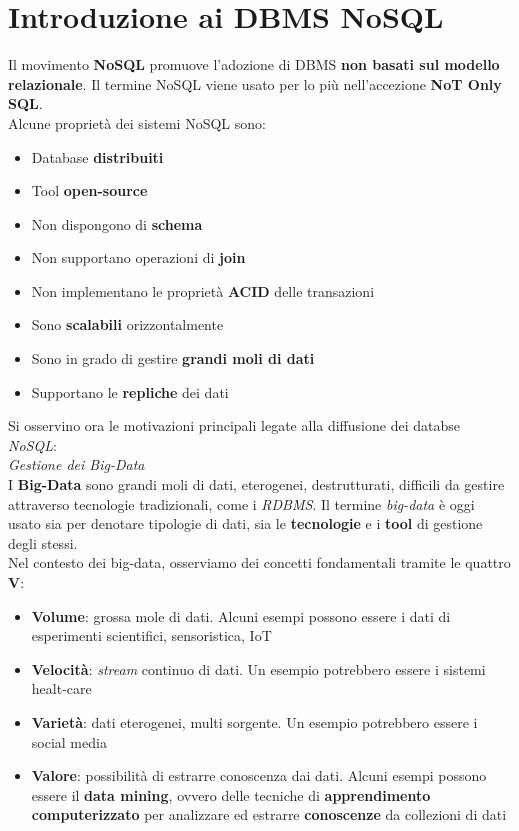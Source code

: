 \documentclass{article}
\begin{document}
\pagestyle{empty}

\section*{Introduzione ai DBMS NoSQL} 
\large

Il movimento \textbf{NoSQL} promuove l'adozione di DBMS \textbf{non basati sul modello relazionale}. Il termine NoSQL viene usato per lo più nell'accezione \textbf{NoT Only SQL}.\\
Alcune proprietà dei sistemi NoSQL sono:
\begin{itemize}[label={-}, leftmargin=1cm]
    \item Database \textbf{distribuiti}
    \item Tool \textbf{open-source}
    \item Non dispongono di \textbf{schema}
    \item Non supportano operazioni di \textbf{join}
    \item Non implementano le proprietà \textbf{ACID} delle transazioni
    \item Sono \textbf{scalabili} orizzontalmente
    \item Sono in grado di gestire \textbf{grandi moli di dati}
    \item Supportano le \textbf{repliche} dei dati
\end{itemize}
Si osservino ora le motivazioni principali legate alla diffusione dei databse \textit{NoSQL}:\vspace{14pt}\\
\textit{Gestione dei Big-Data}\\
I \textbf{Big-Data} sono grandi moli di dati, eterogenei, destrutturati, difficili da gestire attraverso tecnologie tradizionali, come i \textit{RDBMS}. Il termine \textit{big-data} è oggi usato sia per denotare tipologie di dati, sia le \textbf{tecnologie} e i \textbf{tool} di gestione degli stessi.\\
Nel contesto dei big-data, osserviamo dei concetti fondamentali tramite le quattro \textbf{V}:
\begin{itemize}[label={-}, leftmargin=1cm]
    \item \textbf{Volume}: grossa mole di dati. Alcuni esempi possono essere i dati di esperimenti scientifici, sensoristica, IoT
    \item \textbf{Velocità}: \textit{stream} continuo di dati. Un esempio potrebbero essere i sistemi healt-care
    \item \textbf{Varietà}: dati eterogenei, multi sorgente. Un esempio potrebbero essere i social media
    \item \textbf{Valore}: possibilità di estrarre conoscenza dai dati. Alcuni esempi possono essere il \textbf{data mining}, ovvero delle tecniche di \textbf{apprendimento computerizzato} per analizzare ed estrarre \textbf{conoscenze} da collezioni di dati\\
\end{itemize}
\end{document}

